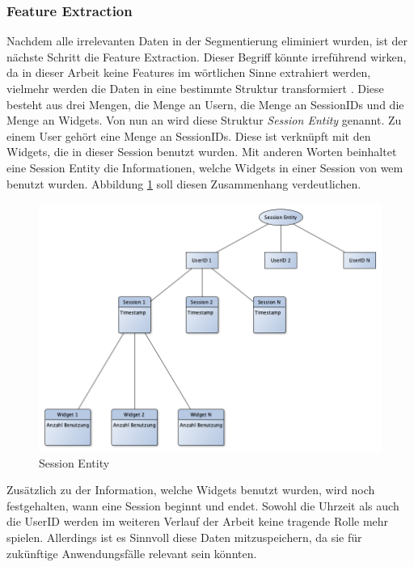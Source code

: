 \subsubsection{Feature Extraction}
	\label{ssub:Feature_extraction}
Nachdem alle irrelevanten Daten in der Segmentierung eliminiert wurden, ist der nächste Schritt die Feature Extraction. Dieser Begriff könnte irreführend wirken, da in dieser Arbeit keine Features im wörtlichen Sinne extrahiert werden, vielmehr werden die Daten in eine bestimmte Struktur transformiert \citep{BeKe19}. Diese besteht aus drei Mengen, die Menge an Usern, die Menge an SessionIDs und die Menge an Widgets. Von nun an wird diese Struktur \textit{Session Entity} genannt. Zu einem User gehört eine Menge an SessionIDs. Diese ist verknüpft mit den Widgets, die in dieser Session benutzt wurden. Mit anderen Worten beinhaltet eine Session Entity die Informationen, welche Widgets in einer Session von wem benutzt wurden. Abbildung \ref{fig:session-entity} soll diesen Zusammenhang verdeutlichen.\\
\begin{figure}[htb]
\begin{center}
	\includegraphics[width=\textwidth]{bilder/session-entity.png}
\end{center}
\caption{Session Entity}
\label{fig:session-entity}
\end{figure}

Zusätzlich zu der Information, welche Widgets benutzt wurden, wird noch festgehalten, wann eine Session beginnt und endet. Sowohl die Uhrzeit als auch die UserID werden im weiteren Verlauf der Arbeit keine tragende Rolle mehr spielen. Allerdings ist es Sinnvoll diese Daten mitzuspeichern, da sie für zukünftige Anwendungsfälle relevant sein könnten.


